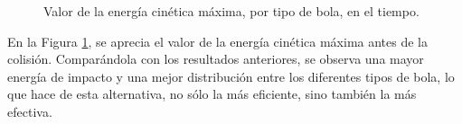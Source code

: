 \begin{figure}[h!]
\centering
{}
\caption{Valor de la energ\'ia cin\'etica m\'axima, por tipo de bola, en el tiempo.}
\label{res3}
\end{figure}

\noindent
\justify

En la Figura \ref{res3}, se aprecia el valor de la energ\'ia cin\'etica m\'axima antes de la colisi\'on. Compar\'andola con los resultados anteriores, se observa una mayor energ\'ia de impacto y una mejor distribuci\'on entre los diferentes tipos de bola, lo que hace de esta alternativa, no s\'olo la m\'as eficiente, sino tambi\'en la m\'as efectiva.

